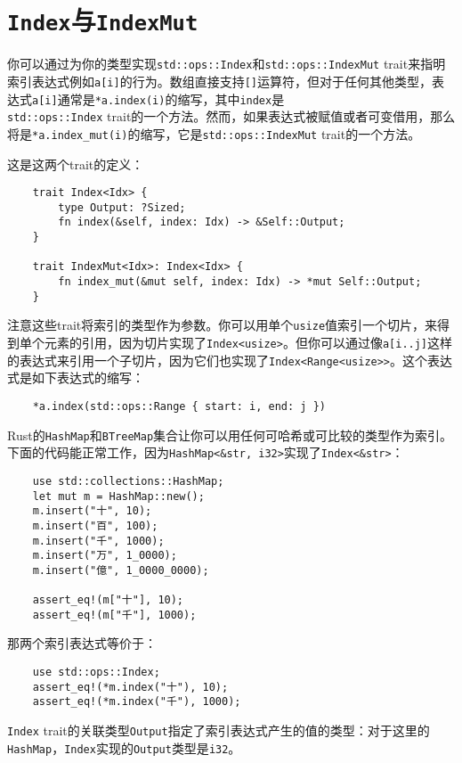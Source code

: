 \section{\texttt{Index}与\texttt{IndexMut}}\label{index}

你可以通过为你的类型实现\texttt{std::ops::Index}和\texttt{std::ops::IndexMut} trait来指明索引表达式例如\texttt{a[i]}的行为。数组直接支持\texttt{[]}运算符，但对于任何其他类型，表达式\texttt{a[i]}通常是\texttt{*a.index(i)}的缩写，其中\texttt{index}是\\
\texttt{std::ops::Index} trait的一个方法。然而，如果表达式被赋值或者可变借用，那么将是\texttt{*a.index\_mut(i)}的缩写，它是\texttt{std::ops::IndexMut} trait的一个方法。

这是这两个trait的定义：
\begin{verbatim}
    trait Index<Idx> {
        type Output: ?Sized;
        fn index(&self, index: Idx) -> &Self::Output;
    }

    trait IndexMut<Idx>: Index<Idx> {
        fn index_mut(&mut self, index: Idx) -> *mut Self::Output;
    }
\end{verbatim}

注意这些trait将索引的类型作为参数。你可以用单个\texttt{usize}值索引一个切片，来得到单个元素的引用，因为切片实现了\texttt{Index<usize>}。但你可以通过像\texttt{a[i..j]}这样的表达式来引用一个子切片，因为它们也实现了\texttt{Index<Range<usize>>}。这个表达式是如下表达式的缩写：
\begin{verbatim}
    *a.index(std::ops::Range { start: i, end: j })
\end{verbatim}

Rust的\texttt{HashMap}和\texttt{BTreeMap}集合让你可以用任何可哈希或可比较的类型作为索引。下面的代码能正常工作，因为\texttt{HashMap<\&str, i32>}实现了\texttt{Index<\&str>}：
\begin{verbatim}
    use std::collections::HashMap;
    let mut m = HashMap::new();
    m.insert("十", 10);
    m.insert("百", 100);
    m.insert("千", 1000);
    m.insert("万", 1_0000);
    m.insert("億", 1_0000_0000);

    assert_eq!(m["十"], 10);
    assert_eq!(m["千"], 1000);
\end{verbatim}

那两个索引表达式等价于：
\begin{verbatim}
    use std::ops::Index;
    assert_eq!(*m.index("十"), 10);
    assert_eq!(*m.index("千"), 1000);
\end{verbatim}

\texttt{Index} trait的关联类型\texttt{Output}指定了索引表达式产生的值的类型：对于这里的\texttt{HashMap}，\texttt{Index}实现的\texttt{Output}类型是\texttt{i32}。

